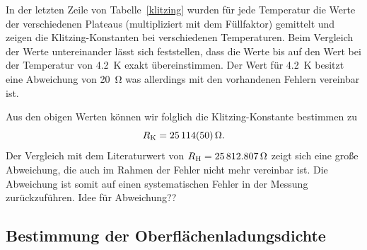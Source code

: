 \documentclass[paper=a4,fontsize=10pt,DIV=18,twocolumn,parskip=half]{scrartcl}
\numberwithin{equation}{section}    %
\newcommand{\note}[1]{{\color{red}#1??}}
\begin{document}
In der letzten Zeile von Tabelle~\ref{klitzing} wurden für jede Temperatur die Werte der verschiedenen Plateaus (multipliziert mit dem Füllfaktor) gemittelt und zeigen die Klitzing-Konstanten bei verschiedenen Temperaturen. Beim Vergleich der Werte untereinander lässt sich feststellen, dass die Werte bis auf den Wert bei der Temperatur von \SI{4.2}{\kelvin} exakt übereinstimmen. Der Wert für \SI{4.2}{\kelvin} besitzt eine Abweichung von \SI{20}{\ohm} was allerdings mit den vorhandenen Fehlern vereinbar ist.

Aus den obigen Werten können wir folglich die Klitzing-Konstante bestimmen zu
\begin{equation}
	R_{\rm K} = \SI{25114(50)}{\ohm}.
\end{equation}
Der Vergleich mit dem Literaturwert von $R_{\rm H} = \SI{25812.807}{\ohm}$ zeigt sich eine große Abweichung, die auch im Rahmen der Fehler nicht mehr vereinbar ist. Die Abweichung ist somit auf einen systematischen Fehler in der Messung zurückzuführen. \note{Idee für Abweichung}

\subsection{Bestimmung der Oberflächenladungsdichte}
\end{document}
